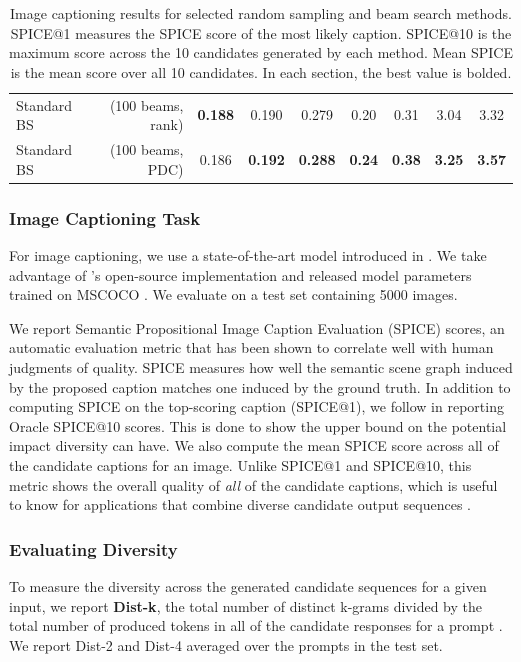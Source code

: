 \begin{table}
\begin{tabular}{|lr||ccc||cccc|}
\hline \hline
Standard BS &(100 beams, rank)        & \textbf{0.188} & 0.190 & 0.279 & 0.20 & 0.31 & 3.04 & 3.32 \\
Standard BS &(100 beams, PDC)         & 0.186 & \textbf{0.192} & \textbf{0.288} & \textbf{0.24} & \textbf{0.38} & \textbf{3.25} & \textbf{3.57} \\
\hline
\end{tabular}
\caption{Image captioning results for selected random sampling and beam search methods. SPICE@1 measures the SPICE score of the most likely caption. SPICE@10 is the maximum score across the 10 candidates generated by each method. Mean SPICE is the mean score over all 10 candidates. In each section, the best value is bolded.}
\label{tab:image_captioning}
\end{table}

\subsubsection{Image Captioning Task}
For image captioning, we use a state-of-the-art model introduced in \citet{anderson2018bottom}.
We take advantage of \citet{Luo2017}'s open-source implementation and released model parameters trained on MSCOCO \cite{lin2014microsoft}.
We evaluate on a test set containing 5000 images.

We report Semantic Propositional Image Caption Evaluation (SPICE) scores, an automatic evaluation metric that has been shown to correlate well with human judgments of quality\citep{Anderson2016SPICE}. 
SPICE measures how well the semantic scene graph induced by the proposed caption matches one induced by the ground truth.
In addition to computing SPICE on the top-scoring caption (SPICE@1), we follow \citet{vijayakumar2016diverse} in reporting Oracle SPICE@10 scores.
This is done to show the upper bound on the potential impact diversity can have.
We also compute the mean SPICE score across all of the candidate captions for an image.
Unlike SPICE@1 and SPICE@10, this metric shows the overall quality of \textit{all}
of the candidate captions, which is useful to know for applications that combine diverse candidate output sequences \cite{krause2017hierarchical}.

\subsubsection{Evaluating Diversity}
To measure the diversity across the generated candidate sequences for a given input, we report \textbf{Dist-k}, the total number of distinct k-grams divided by the total number of produced tokens in all of the candidate responses for a prompt \citep{li2016diversity}. 
We report Dist-2 and Dist-4 averaged over the prompts in the test set.

